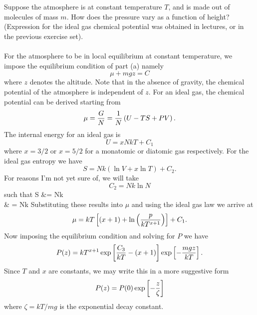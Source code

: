 \documentclass[11pt,letterpaper]{article}
\begin{document}
		\\
		\\
		\item
		Suppose the atmosphere is at constant temperature $T$, and is made out of molecules of mass $m$. How does
		the pressure vary as a function of height? (Expression for the ideal gas chemical potential was obtained in lectures,
		or in the previous exercise set).
		\\
		\\
		For the atmosphere to be in local equilibrium at constant temperature, we impose the equilibrium condition of part (a) namely
		\[
			\mu+mgz = C
		\]
		where $z$ denotes the altitude. Note that in the absence of gravity, the chemical potential of the atmosphere is independent
		of $z$. For an ideal gas, the chemical potential can be derived starting from
		\[
			\mu = \frac{G}{N} = \frac{1}{N}\left(U-TS+PV\right).
		\]
		The internal energy for an ideal gas is
		\[
			U = xNkT+C_1
		\]
		where $x=3/2$ or $x=5/2$ for a monatomic or diatomic gas respectively. For the ideal gas entropy we have
		\[
			S = Nk(\ln V+x\ln T)+C_2.
		\]
		For reasons I'm not yet sure of, we will take 
		\[
			C_2 = Nk\ln N
		\] 
		such that
		\ba
			S &= Nk\ln{} \\
			& = Nk\ln{}
		\ea
		Substituting these results into $\mu$ and using the ideal gas law we arrive at
		\[
			\mu = kT\left[(x+1)+\ln\left(\frac{p}{kT^{x+1}}\right)\right]+C_1.
		\]
		Now imposing the equilibrium condition and solving for $P$ we have
		\[
			P(z) = kT^{x+1}\exp\left[\frac{C_3}{kT}-(x+1)\right]\exp\left[-\frac{mgz}{kT}\right].
		\]
		Since $T$ and $x$ are constants, we may write this in a more suggestive form
		\[
			P(z) = P(0)\exp\left[-\frac{z}{\zeta}\right]
		\]
		where $\zeta = kT/mg$ is the exponential decay constant. 
		\\
		\\
	\eenum
\end{document}
